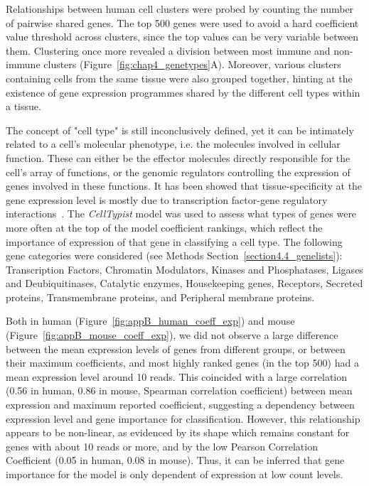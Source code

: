 Relationships between human cell clusters were probed by counting the number of pairwise shared genes. The top 500 genes were used to avoid a hard coefficient value threshold across clusters, since the top values can be very variable between them. Clustering once more revealed a division between most immune and non-immune clusters (Figure~\ref{fig:chap4_genetypes}A). Moreover, various clusters containing cells from the same tissue were also grouped together, hinting at the existence of gene expression programmes shared by the different cell types within a tissue. 

The concept of "cell type" is still inconclusively defined, yet it can be intimately related to a cell's molecular phenotype, i.e. the molecules involved in cellular function. These can either be the effector molecules directly responsible for the cell's array of functions, or the genomic regulators controlling the expression of genes involved in these functions. It has been showed that tissue-specificity at the gene expression level is mostly due to transcription factor-gene regulatory interactions~\citep{sonawane_understanding_2017}. The \textit{CellTypist} model was used to assess what types of genes were more often at the top of the model coefficient rankings, which reflect the importance of expression of that gene in classifying a cell type. The following gene categories were considered (see Methods Section~\ref{section4.4_genelists}): Transcription Factors, Chromatin Modulators, Kinases and Phosphatases, Ligases and Deubiquitinases, Catalytic enzymes, Housekeeping genes, Receptors, Secreted proteins, Transmembrane proteins, and Peripheral membrane proteins. 

Both in human (Figure~\ref{fig:appB_human_coeff_exp}) and mouse (Figure~\ref{fig:appB_mouse_coeff_exp}), we did not observe a large difference between the mean expression levels of genes from different groups, or between their maximum coefficients, and most highly ranked genes (in the top 500) had a mean expression level around 10 reads. This coincided with a large correlation (0.56 in human, 0.86 in mouse, Spearman correlation coefficient) between mean expression and maximum reported coefficient, suggesting a dependency between expression level and gene importance for classification. However, this relationship appears to be non-linear, as evidenced by its shape which remains constant for genes with about 10 reads or more, and by the low Pearson Correlation Coefficient (0.05 in human, 0.08 in mouse). Thus, it can be inferred that gene importance for the model is only dependent of expression at low count levels.

